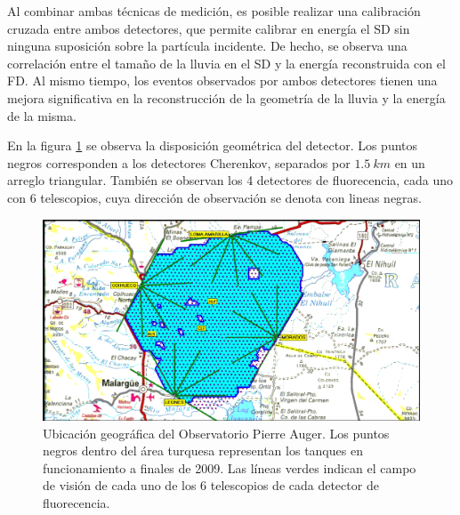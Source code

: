 	Al combinar ambas t\'ecnicas de medici\'on, es posible realizar una calibraci\'on cruzada entre ambos detectores, que permite calibrar en energ\'ia el SD sin ninguna suposici\'on sobre la part\'icula incidente.
	De hecho, se observa una correlaci\'on entre el tama\~no de la lluvia en el SD y la energ\'ia reconstruida con el FD.
	Al mismo tiempo, los eventos observados por ambos detectores tienen una mejora significativa en la reconstrucci\'on de la geometr\'ia de la lluvia y la energ\'ia de la misma.
	
	En la figura \ref{fig:plano_auger} se observa la disposici\'on geom\'etrica del detector.
	Los puntos negros corresponden a los detectores Cherenkov, separados por $1.5\ km$ en un arreglo triangular.
	Tambi\'en se observan los 4 detectores de fluorecencia, cada uno con 6 telescopios, cuya direcci\'on de observaci\'on se denota con lineas negras.
	
	\begin{figure}[h!]
		\begin{center}
		\includegraphics[width=\textwidth]{fig/detectorAuger/array}
		\caption{\label{fig:plano_auger} Ubicaci\'on geogr\'afica del Observatorio Pierre Auger. Los puntos negros dentro del \'area turquesa representan los tanques en funcionamiento a finales de 2009. 
		Las l\'ineas verdes indican el campo de visi\'on de cada uno de los 6 telescopios de cada detector de fluorecencia.}
		\end{center}
	\end{figure}
	
